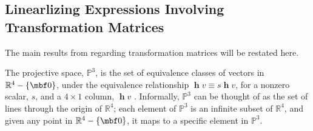 \documentclass[11pt,a4,oneside]{article}
\begin{document}
\subsection{Linearlizing Expressions Involving Transformation Matrices\label{s:Tx}}
The main results from \citet{FurgaleThesis} regarding transformation matrices will be restated here.

The projective space, $\mathbb{P}^3$, is the set of equivalence classes of vectors in $\mathbb{R}^4 - \{\mbf 0\}$, under the equivalence relationship $\mbfh v \equiv s \mbfh v$, for a nonzero scalar, $s$, and a $4 \times 1$ column, $\mbfh v$ \citep{Hartley0001,Faugeras0100}. Informally, $\mathbb{P}^3$ can be thought of as the set of lines through the origin of $\mathbb{R}^4$; each element of $\mathbb{P}^3$ is an infinite subset of $\mathbb{R}^4$, and given any point in $\mathbb{R}^4 - \{\mbf 0\}$, it maps to a specific element in $\mathbb{P}^3$.
\end{document}
